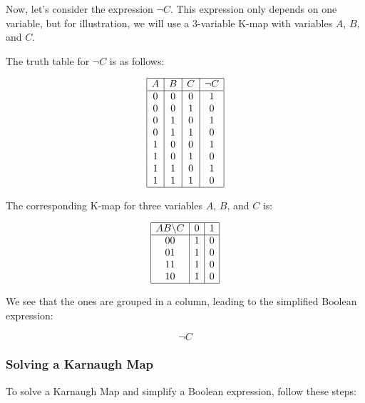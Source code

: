 Now, let's consider the expression \( \neg C \). This expression only 
depends on one variable, but for illustration, we will use a 
3-variable K-map with variables \(A\), \(B\), and \(C\).
\vspace{\baselineskip}

The truth table for \( \neg C \) is as follows:

\[
	\begin{array}{|c|c|c|c|}
		\hline
		A & B & C & \neg C \\
		\hline
		0 & 0 & 0 & 1      \\
		0 & 0 & 1 & 0      \\
		0 & 1 & 0 & 1      \\
		0 & 1 & 1 & 0      \\
		1 & 0 & 0 & 1      \\
		1 & 0 & 1 & 0      \\
		1 & 1 & 0 & 1      \\
		1 & 1 & 1 & 0      \\
		\hline
	\end{array}
\]

The corresponding K-map for three variables \(A\), \(B\), and \(C\) is:

\[
	\begin{array}{|c|c|c|c|}
		\hline
		AB \backslash C & 0 & 1 \\
		\hline
		00              & 1 & 0 \\
		01              & 1 & 0 \\
		11              & 1 & 0 \\
		10              & 1 & 0 \\
		\hline
	\end{array}
\]

We see that the ones are grouped in a column, leading to the simplified Boolean expression:

\[
	\neg C
\]

\subsubsection{Solving a Karnaugh Map}

To solve a Karnaugh Map and simplify a Boolean expression, follow these steps:

